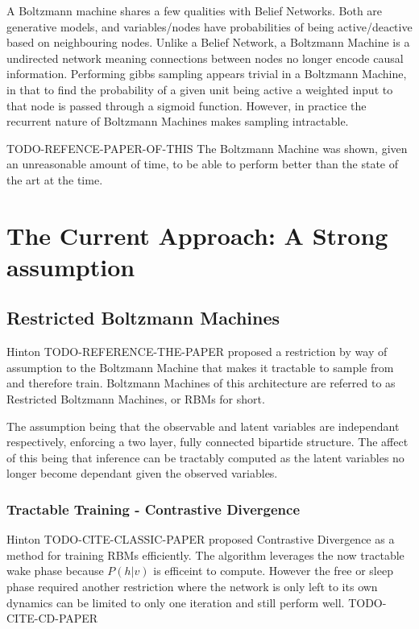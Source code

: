 A Boltzmann machine shares a few qualities with Belief Networks. Both are generative models, and variables/nodes have probabilities of being active/deactive based on neighbouring nodes. Unlike a Belief Network, a Boltzmann Machine is a undirected network meaning connections between nodes no longer encode causal information. Performing gibbs sampling appears trivial in a Boltzmann Machine, in that to find the probability of a given unit being active a weighted input to that node is passed through a sigmoid function. However, in practice the recurrent nature of Boltzmann Machines makes sampling intractable.

TODO-REFENCE-PAPER-OF-THIS The Boltzmann Machine was shown, given an unreasonable amount of time, to be able to perform better than the state of the art at the time.

\section{The Current Approach: A Strong assumption}

\subsection{Restricted Boltzmann Machines}

Hinton TODO-REFERENCE-THE-PAPER proposed a restriction by way of assumption to the Boltzmann Machine that makes it tractable to sample from and therefore train. Boltzmann Machines of this architecture are referred to as Restricted Boltzmann Machines, or RBMs for short.

The assumption being that the observable and latent variables are independant respectively, enforcing a two layer, fully connected bipartide structure. The affect of this being that inference can be tractably computed as the latent variables no longer become dependant given the observed variables.

  \subsubsection{Tractable Training - Contrastive Divergence}
  Hinton TODO-CITE-CLASSIC-PAPER proposed Contrastive Divergence as a method for training RBMs efficiently. The algorithm leverages the now tractable wake phase because $P(h|v)$ is efficeint to compute. However the free or sleep phase required another restriction where the network is only left to its own dynamics can be limited to only one iteration and still perform well. TODO-CITE-CD-PAPER

